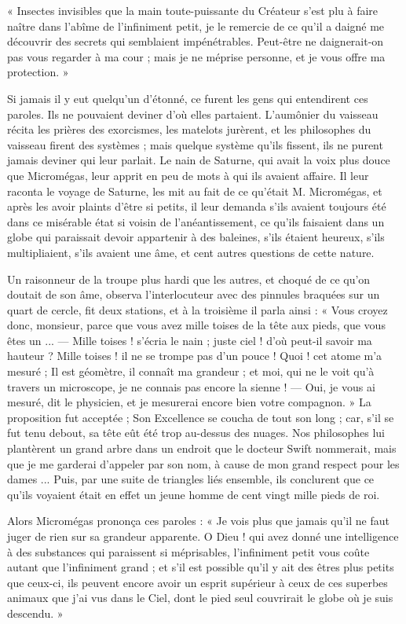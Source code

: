 \documentclass[a4paper, 11pt, oneside, landscape]{article}
\begin{document}
« Insectes invisibles que la main toute-puissante du Créateur s'est plu à faire naître dans l'abîme de l'infiniment petit, je le remercie de ce qu'il a daigné me découvrir des secrets qui semblaient impénétrables. Peut-être ne daignerait-on pas vous regarder à ma cour ; mais je ne méprise personne, et je vous offre ma protection. »

Si jamais il y eut quelqu'un d'étonné, ce furent les gens qui entendirent ces paroles. Ils ne pouvaient deviner d'où elles partaient. L'aumônier du vaisseau récita les prières des exorcismes, les matelots jurèrent, et les philosophes du vaisseau firent des systèmes ; mais quelque système qu'ils fissent, ils ne purent jamais deviner qui leur parlait. Le nain de Saturne, qui avait la voix plus douce que Micromégas, leur apprit en peu de mots à qui ils avaient affaire. Il leur raconta le voyage de Saturne, les mit au fait de ce qu'était M. Micromégas, et après les avoir plaints d'être si petits, il leur demanda s'ils avaient toujours été dans ce misérable état si voisin de l'anéantissement, ce qu'ils faisaient dans un globe qui paraissait devoir appartenir à des baleines, s'ils étaient heureux, s'ils multipliaient, s'ils avaient une âme, et cent autres questions de cette nature.

Un raisonneur de la troupe plus hardi que les autres, et choqué de ce qu'on doutait de son âme, observa l'interlocuteur avec des pinnules braquées sur un quart de cercle, fit deux stations, et à la troisième il parla ainsi : « Vous croyez donc, monsieur, parce que vous avez mille toises de la tête aux pieds, que vous êtes un ... --- Mille toises ! s'écria le nain ; juste ciel ! d'où peut-il savoir ma hauteur ? Mille toises ! il ne se trompe pas d'un pouce ! Quoi ! cet atome m'a mesuré ; Il est géomètre, il connaît ma grandeur ; et moi, qui ne le voit qu'à travers un microscope, je ne connais pas encore la sienne ! --- Oui, je vous ai mesuré, dit le physicien, et je mesurerai encore bien votre compagnon. » La proposition fut acceptée ; Son Excellence se coucha de tout son long ; car, s'il se fut tenu debout, sa tête eût été trop au-dessus des nuages. Nos philosophes lui plantèrent un grand arbre dans un endroit que le docteur Swift nommerait, mais que je me garderai d'appeler par son nom, à cause de mon grand respect pour les dames ... Puis, par une suite de triangles liés ensemble, ils conclurent que ce qu'ils voyaient était en effet un jeune homme de cent vingt mille pieds de roi.

Alors Micromégas prononça ces paroles : « Je vois plus que jamais qu'il ne faut juger de rien sur sa grandeur apparente. O Dieu ! qui avez donné une intelligence à des substances qui paraissent si méprisables, l'infiniment petit vous coûte autant que l'infiniment grand ; et s'il est possible qu'il y ait des êtres plus petits que ceux-ci, ils peuvent encore avoir un esprit supérieur à ceux de ces superbes animaux que j'ai vus dans le Ciel, dont le pied seul couvrirait le globe où je suis descendu. »
\end{document}
